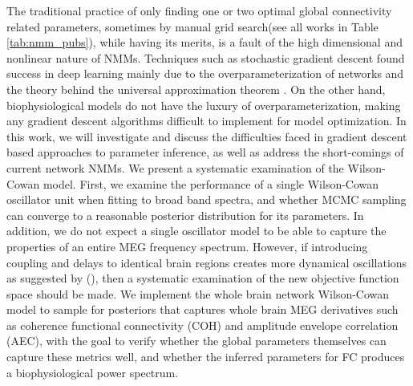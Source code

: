 The traditional practice of only finding one or two optimal global connectivity related parameters, sometimes by manual grid search(see all works in Table \ref{tab:nmm_pubs}), while having its merits, is a fault of the high dimensional and nonlinear nature of NMMs. Techniques such as stochastic gradient descent found success in deep learning mainly due to the overparameterization of networks and the theory behind the universal approximation theorem \cite{lu_expressive_2017, zhou_universality_2020}. On the other hand, biophysiological models do not have the luxury of overparameterization, making any gradient descent algorithms difficult to implement for model optimization. In this work, we will investigate and discuss the difficulties faced in gradient descent based approaches to parameter inference, as well as address the short-comings of current network NMMs. We present a systematic examination of the Wilson-Cowan model. First, we examine the performance of a single Wilson-Cowan oscillator unit when fitting to broad band spectra, and whether MCMC sampling can converge to a reasonable posterior distribution for its parameters. In addition, we do not expect a single oscillator model to be able to capture the properties of an entire MEG frequency spectrum. However, if introducing coupling and delays to identical brain regions creates more dynamical oscillations as suggested by (\cite{Deco2009}), then a systematic examination of the new objective function space should be made. We implement the whole brain network Wilson-Cowan model to sample for posteriors that captures whole brain MEG derivatives such as coherence functional connectivity (COH) and amplitude envelope correlation (AEC), with the goal to verify whether the global parameters themselves can capture these metrics well, and whether the inferred parameters for FC produces a biophysiological power spectrum.

